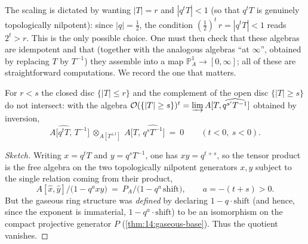 The scaling is dictated by wanting $|T|=r$ and $|q^{t}T|<1$ (so that $q^{t}T$ is
genuinely topologically nilpotent): since $|q|=\tfrac12$, the condition
$(\tfrac12)^{t}\,r=|q^{t}T|<1$ reads $2^{t}>r$. This is the only possible choice.
One must then check that these algebras are idempotent and that (together with
the analogous algebras ``at $\infty$'', obtained by replacing $T$ by $T^{-1}$)
they assemble into a map $\mathbb P^1_A\to[0,\infty]$; all of these are
straightforward computations. We record the one that matters.

\begin{proposition}
\label{prop:21:disjoint-discs}
For $r<s$ the closed disc $\{|T|\le r\}$ and the complement of the open disc
$\{|T|\ge s\}$ do not intersect: with the algebra
$\mathcal O(\{|T|\ge s\})^{t}=\varinjlim A[T,\widehat{q^{s'}T^{-1}}]$ obtained by
inversion,
\begin{equation*}
A\bigl[\widehat{q^{t}T},\,T^{-1}\bigr]\ \otimes_{A[T^{\pm1}]}\
A\bigl[T,\,\widehat{q^{s}T^{-1}}\bigr]\ =\ 0
\qquad(t<0,\ s<0).
\end{equation*}
\end{proposition}

\begin{proof}[Sketch]
Writing $x=q^{t}T$ and $y=q^{s}T^{-1}$, one has $xy=q^{t+s}$, so the tensor
product is the free algebra on the two topologically nilpotent generators
$x,y$ subject to the single relation coming from their product,
\begin{equation*}
A[\widehat x,\widehat y]\big/\bigl(1-q^{a}xy\bigr)\ =\ P_A\big/\bigl(1-q^{a}\,\mathrm{shift}\bigr),
\qquad a=-(t+s)>0 .
\end{equation*}
But the gaseous ring structure was \emph{defined} by declaring
$1-q\cdot\mathrm{shift}$ (and hence, since the exponent is immaterial,
$1-q^{a}\cdot\mathrm{shift}$) to be an isomorphism on the compact projective
generator $P$ (\cref{thm:14:gaseous-base}). Thus the quotient vanishes.
\end{proof}

